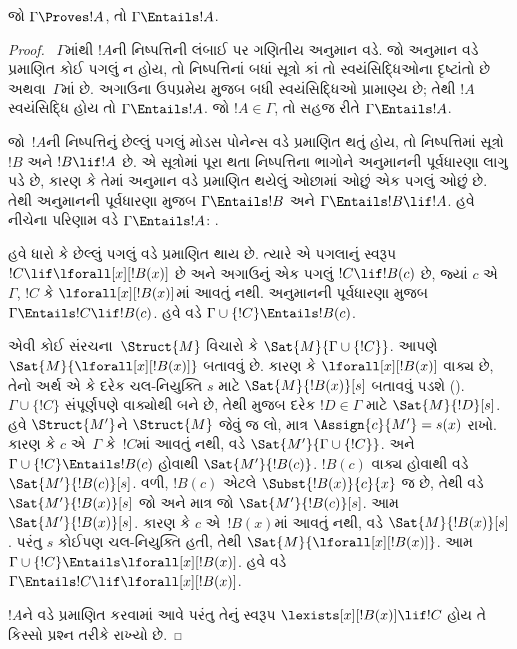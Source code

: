 \begin{thm}[યથાર્થતા]
જો $\Gamma \Proves !A$, તો $\Gamma \Entails !A$.
\end{thm}

\begin{proof}
~$\Gamma$માંથી $!A$ની નિષ્પત્તિની લંબાઈ પર ગણિતીય અનુમાન વડે.
જો અનુમાન વડે પ્રમાણિત કોઈ પગલું ન હોય, તો નિષ્પત્તિનાં બધાં
સૂત્રો કાં તો સ્વયંસિદ્ધિઓના દૃષ્ટાંતો છે અથવા~$\Gamma$માં છે.
અગાઉના ઉપપ્રમેય મુજબ બધી સ્વયંસિદ્ધિઓ
પ્રામાણ્ય છે; તેથી $!A$ સ્વયંસિદ્ધિ હોય તો
$\Gamma \Entails !A$. જો $!A \in \Gamma$, તો સહજ રીતે
$\Gamma \Entails !A$.

જો~$!A$ની નિષ્પત્તિનું છેલ્લું પગલું મોડસ પોનેન્સ વડે પ્રમાણિત
થતું હોય, તો નિષ્પત્તિમાં સૂત્રો $!B$ અને $!B \lif !A$ છે.
એ સૂત્રોમાં પૂરા થતા નિષ્પત્તિના ભાગોને અનુમાનની પૂર્વધારણા
લાગુ પડે છે, કારણ કે તેમાં અનુમાન વડે પ્રમાણિત થયેલું ઓછામાં ઓછું એક
પગલું ઓછું છે. તેથી અનુમાનની પૂર્વધારણા મુજબ
$\Gamma \Entails !B$ અને $\Gamma \Entails !B \lif !A$. હવે નીચેના
પરિણામ વડે $\Gamma \Entails !A$:
.

હવે ધારો કે છેલ્લું પગલું \QR{} વડે પ્રમાણિત થાય છે.
ત્યારે એ પગલાનું સ્વરૂપ $!C \lif \lforall[x][!B(x)]$ છે અને અગાઉનું
એક પગલું $!C \lif !B(c)$ છે, જ્યાં $c$ એ~$\Gamma$, $!C$ કે
$\lforall[x][!B(x)]$માં આવતું નથી. અનુમાનની પૂર્વધારણા મુજબ
$\Gamma \Entails !C \lif !B(c)$. હવે
 વડે
$\Gamma \cup \{!C\} \Entails !B(c)$.

એવી કોઈ સંરચના~$\Struct{M}$ વિચારો કે
$\Sat{M}{\Gamma \cup \{!C\}}$. આપણે
$\Sat{M}{\lforall[x][!B(x)]}$ બતાવવું છે. કારણ કે
$\lforall[x][!B(x)]$ વાક્ય છે, તેનો અર્થ એ કે દરેક ચલ-નિયુક્તિ
$s$ માટે $\Sat{M}{!B(x)}[s]$ બતાવવું પડશે
(). $\Gamma \cup \{!C\}$ સંપૂર્ણપણે
વાક્યોથી બને છે, તેથી  મુજબ દરેક
$!D \in \Gamma$ માટે $\Sat{M}{!D}[s]$. હવે $\Struct{M'}$ને
$\Struct{M}$ જેવું જ લો, માત્ર $\Assign{c}{M'} = s(x)$ રાખો. કારણ કે
$c$ એ~$\Gamma$ કે~$!C$માં આવતું નથી,
 વડે
$\Sat{M'}{\Gamma \cup \{!C\}}$. અને
$\Gamma \cup \{!C\} \Entails !B(c)$ હોવાથી $\Sat{M'}{!B(c)}$.
$!B(c)$ વાક્ય હોવાથી
 વડે
$\Sat{M'}{!B(c)}[s]$. વળી, $!B(c)$ એટલે
$\Subst{!B(x)}{c}{x}$ જ છે, તેથી
 વડે $\Sat{M'}{!B(x)}[s]$ જો અને
માત્ર જો $\Sat{M'}{!B(c)}[s]$. આમ $\Sat{M'}{!B(x)}[s]$. કારણ કે $c$
એ~$!B(x)$માં આવતું નથી,  વડે
$\Sat{M}{!B(x)}[s]$. પરંતુ $s$ કોઈપણ ચલ-નિયુક્તિ હતી, તેથી
$\Sat{M}{\lforall[x][!B(x)]}$. આમ
$\Gamma \cup \{!C\} \Entails \lforall[x][!B(x)]$. હવે
 વડે
$\Gamma \Entails !C \lif \lforall[x][!B(x)]$.

$!A$ને \QR{} વડે પ્રમાણિત કરવામાં આવે પરંતુ તેનું સ્વરૂપ
$\lexists[x][!B(x)] \lif !C$ હોય તે કિસ્સો પ્રશ્ન તરીકે રાખ્યો છે.
\end{proof}

